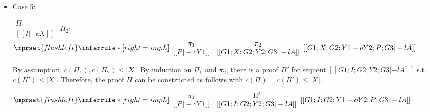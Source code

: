 \begin{itemize}
\item Case 5:
      \begin{center}
        \scriptsize
        \begin{math}
          \begin{array}{c}
            \Pi_1 \\
            {[[I |-c X]]}
          \end{array}
        \end{math}
        \qquad\qquad
        $\Pi_2$:
        \begin{math}
          $$\mprset{flushleft}
          \inferrule* [right={\tiny impL}] {
            {
              \begin{array}{cc}
                \pi_1 & \pi_2 \\
                {[[P |-c Y1]]} & {[[G1; X; G2; Y2; G3 |-l A]]}
              \end{array}
            }
          }{[[G1; X; G2; Y1 -o Y2; P; G3 |-l A]]}
        \end{math}
      \end{center}
      By assumption, $c(\Pi_1),c(\Pi_2)\leq |X|$. By induction on $\Pi_1$
      and $\pi_2$, there is a proof $\Pi'$ for sequent
      $[[G1; I; G2; Y2; G3 |-l A]]$ s.t. $c(\Pi') \leq |X|$. Therefore, the
      proof $\Pi$ can be constructed as follows with
      $c(\Pi) = c(\Pi') \leq |X|$.
      \begin{center}
        \scriptsize
        \begin{math}
          $$\mprset{flushleft}
          \inferrule* [right={\tiny impL}] {
            {
              \begin{array}{cc}
                \pi_1 & \Pi' \\
                {[[P |-c Y1]]} & {[[G1; I; G2; Y2; G3 |-l A]]}
              \end{array}
            }
          }{[[G1; I; G2; Y1 -o Y2; P; G3 |-l A]]}
        \end{math}
      \end{center}


\end{itemize}
